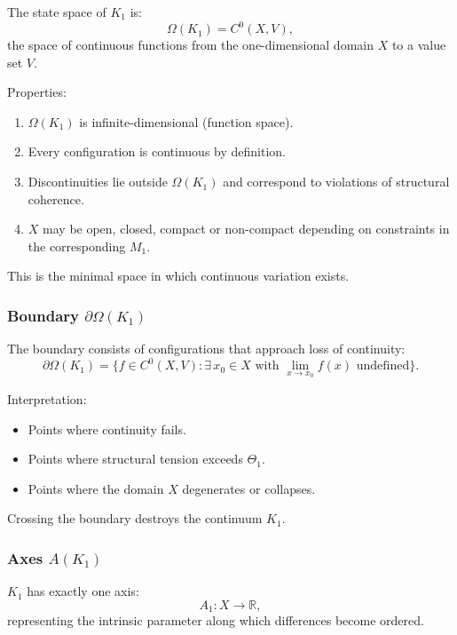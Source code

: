 The state space of $K_1$ is:
\[
\Omega(K_1) = C^0(X, V),
\]
the space of continuous functions from the one-dimensional domain $X$
to a value set $V$.

Properties:
\begin{enumerate}
    \item $\Omega(K_1)$ is infinite-dimensional (function space).
    \item Every configuration is continuous by definition.
    \item Discontinuities lie outside $\Omega(K_1)$ and correspond to
          violations of structural coherence.
    \item $X$ may be open, closed, compact or non-compact depending on
          constraints in the corresponding $M_1$.
\end{enumerate}

This is the minimal space in which continuous variation exists.

\subsubsection{Boundary \texorpdfstring{$\partial\Omega(K_1)$}{\partial\Omega(K_1)}}

The boundary consists of configurations that approach loss of
continuity:
\[
\partial\Omega(K_1) =
\{ f \in C^0(X,V) : \exists\, x_0 \in X \text{ with } 
\lim_{x \to x_0} f(x) \text{ undefined} \}.
\]

Interpretation:
\begin{itemize}
    \item Points where continuity fails.
    \item Points where structural tension exceeds $\Theta_1$.
    \item Points where the domain $X$ degenerates or collapses.
\end{itemize}

Crossing the boundary destroys the continuum $K_1$.

\subsubsection{Axes \texorpdfstring{$A(K_1)$}{A(K_1)}}

$K_1$ has exactly one axis:
\[
A_1 : X \to \mathbb{R},
\]
representing the intrinsic parameter along which differences become
ordered.

